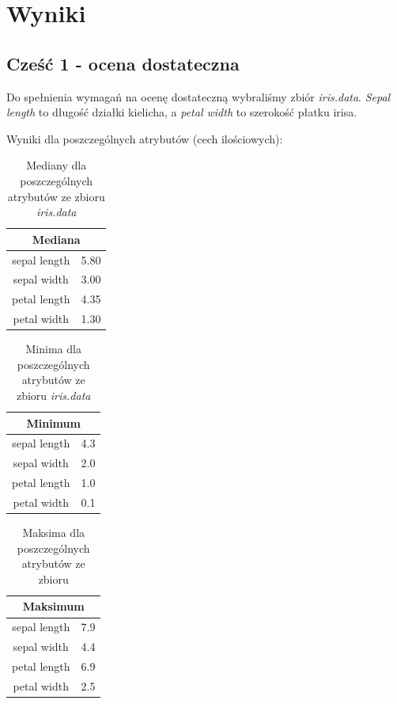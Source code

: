 \documentclass{classrep}
\begin{document}
\section{Wyniki}
\subsection{Cześć 1 - ocena dostateczna}

Do spełnienia wymagań na ocenę dostateczną wybraliśmy zbiór \textit{iris.data}.
\textit{Sepal length} to długość działki kielicha, a \textit{petal width} to szerokość płatku irisa.

Wyniki dla poszczególnych atrybutów (cech ilościowych):

\begin{table}[H]
    \centering
    \begin{tabular}{|c|c|}
    \hline
    \multicolumn{2}{|c|}{\textbf{Mediana}} \\ \hline
    sepal length           & 5.80          \\ \hline
    sepal width            & 3.00          \\ \hline
    petal length           & 4.35          \\ \hline
    petal width            & 1.30          \\ \hline
    \end{tabular}
    \caption{Mediany dla poszczególnych atrybutów ze zbioru \textit{iris.data}}
    \label{tab:w1}
\end{table}

\begin{table}[H]
    \centering
    \begin{tabular}{|c|c|}
    \hline
    \multicolumn{2}{|c|}{\textbf{Minimum}} \\ \hline
    sepal length           & 4.3           \\ \hline
    sepal width            & 2.0           \\ \hline
    petal length           & 1.0           \\ \hline
    petal width            & 0.1           \\ \hline
    \end{tabular}
    \caption{Minima dla poszczególnych atrybutów ze zbioru \textit{iris.data}}
    \label{tab:w2}
\end{table}

\begin{table}[H]
    \centering 
    \begin{tabular}{|c|c|}
    \hline
    \multicolumn{2}{|c|}{\textbf{Maksimum}} \\ \hline
    sepal length           & 7.9           \\ \hline
    sepal width            & 4.4           \\ \hline
    petal length           & 6.9           \\ \hline
    petal width            & 2.5           \\ \hline
    \end{tabular}
    \caption{Maksima dla poszczególnych atrybutów ze zbioru }
    \label{tab:w3}
\end{table}
\end{document}
